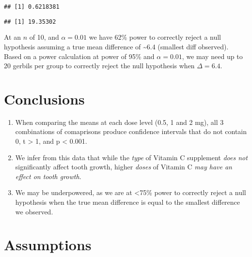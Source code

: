 \documentclass[]{article}
\newenvironment{Shaded}{\begin{snugshade}}{\end{snugshade}}
\newcommand{\KeywordTok}[1]{\textcolor[rgb]{0.13,0.29,0.53}{\textbf{{#1}}}}
\newcommand{\DataTypeTok}[1]{\textcolor[rgb]{0.13,0.29,0.53}{{#1}}}
\newcommand{\FloatTok}[1]{\textcolor[rgb]{0.00,0.00,0.81}{{#1}}}
\newcommand{\StringTok}[1]{\textcolor[rgb]{0.31,0.60,0.02}{{#1}}}
\newcommand{\NormalTok}[1]{{#1}}
\begin{document}
\begin{verbatim}
## [1] 0.6218381
\end{verbatim}

\begin{Shaded}
\end{Shaded}

\begin{verbatim}
## [1] 19.35302
\end{verbatim}

At an \(n\) of 10, and \(\alpha=0.01\) we have 62\% power to correctly
reject a null hypothesis assuming a true mean difference of
\textasciitilde{}6.4 (smallest diff observed). Based on a power
calculation at power of 95\% and \(\alpha = 0.01\), we may need up to 20
gerbils per group to correctly reject the null hypothesis when
\(\Delta = 6.4\).

\section{Conclusions}\label{conclusions}

\begin{enumerate}
\def\labelenumi{\arabic{enumi}.}
\itemsep1pt\parskip0pt
\item
  When comparing the means at each dose level (0.5, 1 and 2 mg), all 3
  combinations of comaprisons produce confidence intervals that do not
  contain 0, t \textgreater{} 1, and p \textless{} 0.001.
\item
  We infer from this data that while the \emph{type} of Vitamin C
  supplement \emph{does not} significantly affect tooth growth, higher
  \emph{doses} of Vitamin C \emph{may have an effect on tooth growth}.
\item
  We may be underpowered, as we are at \textless{}75\% power to
  correctly reject a null hypothesis when the true mean difference is
  equal to the smallest difference we observed.
\end{enumerate}

\section{Assumptions}\label{assumptions}
\end{document}
